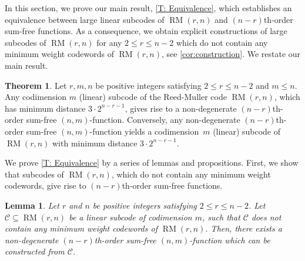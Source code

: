 \documentclass[12pt]{article}
\newtheorem{lem}[thm]{Lemma}
\theoremstyle{definition}
\newtheorem{manualtheoreminner}{Theorem}
\newenvironment{manualtheorem}[1]
  {\renewcommand{\themanualtheoreminner}{\ref{#1}}%
   \begin{manualtheoreminner}}
  {\end{manualtheoreminner}}
\DeclareMathOperator{\RM}{RM}
\begin{document}
In this section, we prove our main result, \cref{T: Equivalence}, which establishes an equivalence between large linear subcodes of $\RM(r,n)$ and $(n-r)$th-order sum-free functions. As a consequence, we obtain explicit constructions of large subcodes of $\RM(r,n)$ for any $2 \leq r \leq n-2$ which do not contain any minimum weight codewords of $\RM(r,n)$, see \cref{cor:construction}. We restate our main result.

\begin{manualtheorem}{T: Equivalence}
     Let $r,m, n$ be positive integers satisfying $2 \leq r \leq n-2$ and $m \leq n$. Any codimension $m$ (linear) subcode of the Reed-Muller code $\RM(r,n)$, which has minimum distance $3\cdot 2^{n-r-1}$, gives rise to a non-degenerate $(n-r)$th-order sum-free $(n, m)$-function. Conversely, any  non-degenerate $(n-r)$th-order sum-free $(n, m)$-function yields a codimension~$m$ (linear) subcode of $\RM(r,n)$ with minimum distance $3 \cdot 2^{n-r-1}$.
\end{manualtheorem}

We prove \cref{T: Equivalence} by a series of lemmas and propositions. First, we show that subcodes of $\RM(r,n)$, which do not contain any minimum weight codewords, give rise to $(n-r)$th-order sum-free functions.

\begin{lem}\label{L: Extract function}
    Let $r$ and $n$ be positive integers satisfying $2 \leq r \leq n-2$. Let $\mathcal{C} \subseteq \RM(r, n)$ be a linear subcode of codimension $m$, such that $\mathcal{C}$ does not contain any minimum weight codewords of $\RM(r,n)$. Then, there exists a non-degenerate $(n-r)$th-order sum-free $(n, m)$-function which can be constructed from $\mathcal{C}$. 
\end{lem}
\end{document}

